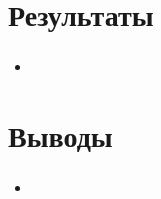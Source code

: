 
\section{Результаты}

\begin{frame}
\frametitle{\insertsection}

\begin{itemize}
    \item 



\end{itemize}
\end{frame}


\section{Выводы}

\begin{frame}
\frametitle{\insertsection}

\begin{itemize}
    \item 



\end{itemize}
\end{frame}

